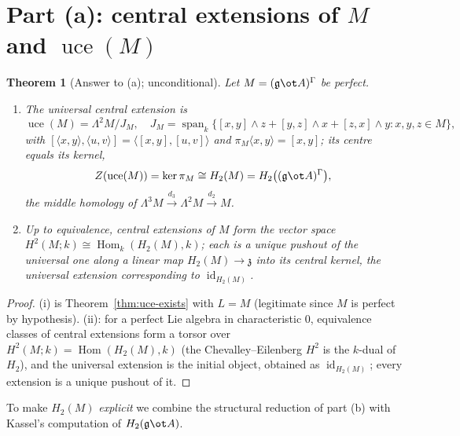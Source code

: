\documentclass{amsart}
\newtheorem{theorem}{Theorem}
\theoremstyle{definition}
\DeclareMathOperator{\uce}{uce}
\DeclareMathOperator{\Hom}{Hom}
\DeclareMathOperator{\id}{id}
\newcommand{\g}{\mathfrak{g}}
\newcommand{\Gm}{\Gamma}
\newcommand{\ra}{\rightarrow}
\begin{document}
\section{Part (a): central extensions of $M$ and $\uce(M)$}

\begin{theorem}[Answer to (a); unconditional]\label{thm:partA}
Let $M=(\g\ot A)^{\Gm}$ be perfect.
\begin{enumerate}
\item[(i)] The universal central extension is
\[
   \uce(M)=\Lambda^2M/J_M,\quad
   J_M=\operatorname{span}_k\{[x,y]\wedge z+[y,z]\wedge x+[z,x]\wedge y:x,y,z\in M\},
\]
with $[\langle x,y\rangle,\langle u,v\rangle]=\langle[x,y],[u,v]\rangle$ and
$\pi_M\langle x,y\rangle=[x,y]$; its centre equals its kernel,
\[
   Z(\uce(M))=\ker\pi_M\cong H_2(M)=H_2\bigl((\g\ot A)^{\Gm}\bigr),
\]
the middle homology of $\Lambda^3M\xrightarrow{d_3}\Lambda^2M\xrightarrow{d_2}M$.
\item[(ii)] Up to equivalence, central extensions of $M$ form the vector space
$H^2(M;k)\cong\Hom_k(H_2(M),k)$; each is a unique pushout of the universal one
along a linear map $H_2(M)\ra\mathfrak z$ into its central kernel, the universal
extension corresponding to $\id_{H_2(M)}$.
\end{enumerate}
\end{theorem}
\begin{proof}
(i) is Theorem~\ref{thm:uce-exists} with $L=M$ (legitimate since $M$ is perfect by
hypothesis).  (ii): for a perfect Lie algebra in characteristic $0$, equivalence
classes of central extensions form a torsor over $H^2(M;k)=\Hom(H_2(M),k)$ (the
Chevalley--Eilenberg $H^2$ is the $k$-dual of $H_2$), and the universal extension
is the initial object, obtained as $\id_{H_2(M)}$; every extension is a unique
pushout of it.
\end{proof}

To make $H_2(M)$ \emph{explicit} we combine the structural reduction of part (b)
with Kassel's computation of $H_2(\g\ot A)$.
\end{document}
